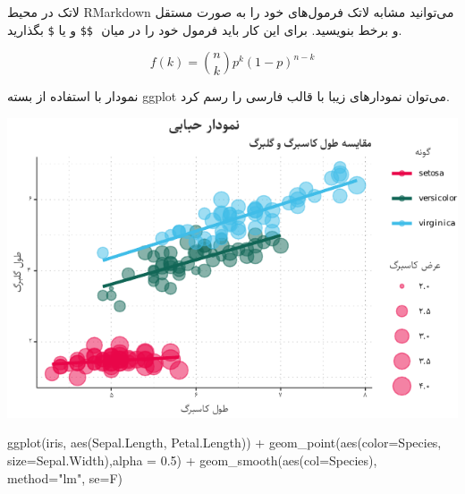 \documentclass[10pt,ignorenonframetext,]{beamer}
\newenvironment{Shaded}{\begin{snugshade}}{\end{snugshade}}
\newcommand{\AttributeTok}[1]{\textcolor[rgb]{0.77,0.63,0.00}{#1}}
\newcommand{\FloatTok}[1]{\textcolor[rgb]{0.00,0.00,0.81}{#1}}
\newcommand{\FunctionTok}[1]{\textcolor[rgb]{0.00,0.00,0.00}{#1}}
\newcommand{\NormalTok}[1]{#1}
\newcommand{\SpecialCharTok}[1]{\textcolor[rgb]{0.00,0.00,0.00}{#1}}
\newcommand{\StringTok}[1]{\textcolor[rgb]{0.31,0.60,0.02}{#1}}
\begin{document}
\begin{frame}[fragile]{لاتک}
\protect\hypertarget{ux644ux627ux62aux6a9}{}
در محیط RMarkdown می‌توانید مشابه لاتک فرمول‌های خود را به صورت مستقل و
برخط بنویسید. برای این‌ کار باید فرمول خود را در میان ‍‍ ‍‍\texttt{\$\$}
و یا \texttt{\$} بگذارید.

\[f\left(k\right)=\binom{n}{k}p^k\left(1-p\right)^{n-k}\]
\end{frame}

\begin{frame}[fragile]{نمودار}
\protect\hypertarget{ux646ux645ux648ux62fux627ux631}{}
با استفاده از بسته ggplot می‌توان نمودارهای زیبا با قالب فارسی را رسم
کرد.

\begin{center}\includegraphics{figure/scatterPlot-1} \end{center}

\begin{Shaded}
\begin{Highlighting}[]
\FunctionTok{ggplot}\NormalTok{(iris, }\FunctionTok{aes}\NormalTok{(Sepal.Length, Petal.Length)) }\SpecialCharTok{+} 
  \FunctionTok{geom\_point}\NormalTok{(}\FunctionTok{aes}\NormalTok{(}\AttributeTok{color=}\NormalTok{Species, }\AttributeTok{size=}\NormalTok{Sepal.Width),}\AttributeTok{alpha =} \FloatTok{0.5}\NormalTok{) }\SpecialCharTok{+}
  \FunctionTok{geom\_smooth}\NormalTok{(}\FunctionTok{aes}\NormalTok{(}\AttributeTok{col=}\NormalTok{Species), }\AttributeTok{method=}\StringTok{"lm"}\NormalTok{, }\AttributeTok{se=}\NormalTok{F)}
\end{Highlighting}
\end{Shaded}
\end{frame}
\end{document}
